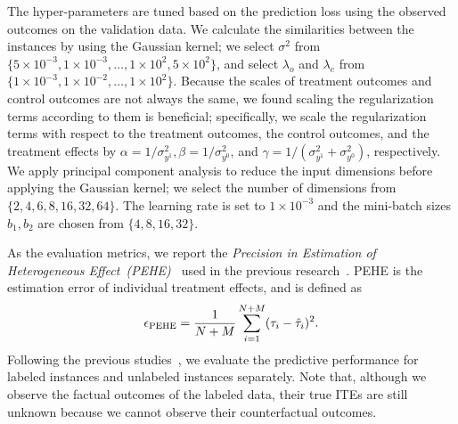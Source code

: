 The hyper-parameters are tuned based on the prediction loss using the  observed outcomes on the validation data. 
We calculate the similarities between the instances by using the Gaussian kernel; 
we select $\sigma^{2}$ from $\{5\times10^{-3}, 1\times10^{-3},\ldots , 1\times10^{2}, 5\times10^{2}\}$, 
and select $\lambda_o$ and $\lambda_e$ from $\{1\times10^{-3}, 1\times10^{-2}, \ldots, 1\times10^{2}\}$. 
Because the scales of treatment outcomes and control outcomes are not always the same, we found scaling the regularization terms according to them is beneficial; 
specifically, we scale the regularization terms with respect to the treatment outcomes, the control outcomes, and the treatment effects by $\alpha={1}/{\sigma_{y^1}^{2}}, \beta={1}/{\sigma_{y^0}^{2}}$, and $\gamma={1}/{(\sigma_{y^1}^{2}+\sigma_{y^0}^{2})}$, respectively.
We apply principal component analysis to reduce the input dimensions before applying the Gaussian kernel; we select the number of dimensions from $\{2, 4, 6, 8, 16, 32, 64\}$. 
The learning rate is set to $1\times10^{-3}$ and the mini-batch sizes $b_1, b_2$ are chosen from $\{4,8,16,32\}$. 

As the evaluation metrics, we report the {\it Precision in Estimation of Heterogeneous Effect~(PEHE)~} used in the previous research~\cite{hill2011bayesian}.
PEHE is the estimation error of individual  treatment effects, and is defined as 
\[
\epsilon_{\rm PEHE}=\frac{1}{N+M}\sum_{i=1}^{N+M}(\tau_i - \hat{\tau}_i)^2.
\]
Following the previous studies~\cite{shalit2017estimating,yao2018representation}, we evaluate the predictive performance for labeled instances and unlabeled instances separately. 
Note that, although we observe the factual outcomes of the labeled data, their true ITEs are still unknown because we cannot observe their counterfactual outcomes.

